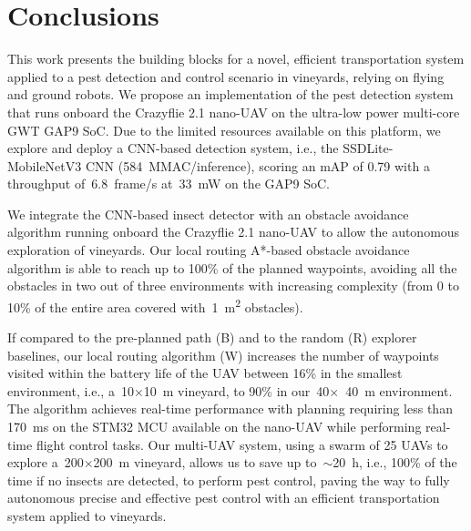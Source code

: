 \section{Conclusions}

This work presents the building blocks for a novel, efficient transportation system applied to a pest detection and control scenario in vineyards, relying on flying and ground robots. 
We propose an implementation of the pest detection system that runs onboard the Crazyflie 2.1 nano-UAV on the ultra-low power multi-core GWT GAP9 SoC.
Due to the limited resources available on this platform, we explore and deploy a CNN-based detection system, i.e., the SSDLite-MobileNetV3 CNN (\SI{584}{\mega MAC/inference}), scoring an mAP of 0.79 with a throughput of~\SI{6.8}{frame/\second} at~\SI{33}{\milli\watt} on the GAP9 SoC.

We integrate the CNN-based insect detector with an obstacle avoidance algorithm running onboard the Crazyflie 2.1 nano-UAV to allow the autonomous exploration of vineyards.
Our local routing A*-based obstacle avoidance algorithm is able to reach up to 100\% of the planned waypoints, avoiding all the obstacles in two out of three environments with increasing complexity (from 0 to 10\% of the entire area covered with~\SI{1}{\meter\squared} obstacles).

If compared to the pre-planned path (B) and to the random (R) explorer baselines, our local routing algorithm (W) increases the number of waypoints visited within the battery life of the UAV between 16\% in the smallest environment, i.e., a~10$\times$\SI{10}{\meter} vineyard, to 90\% in our~40$\times$~\SI{40}{\meter} environment. 
The algorithm achieves real-time performance with planning requiring less than \SI{170}{\milli\second} on the STM32 MCU available on the nano-UAV while performing real-time flight control tasks.
Our multi-UAV system, using a swarm of 25 UAVs to explore a~200$\times$\SI{200}{\meter} vineyard, allows us to save up to~$\sim$\SI{20}{\hour}, i.e., 100\% of the time if no insects are detected, to perform pest control, paving the way to fully autonomous precise and effective pest control with an efficient transportation system applied to vineyards.
